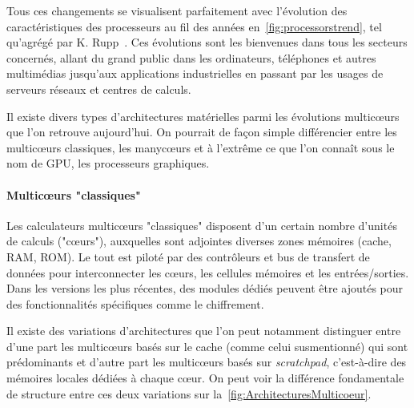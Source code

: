 \documentclass[french, a4paper, 11pt, twoside, pdftex]{StyleThese}
\begin{document}
		Tous ces changements se visualisent parfaitement avec l'évolution des caractéristiques des processeurs au fil des années en~\autoref{fig:processorstrend}, tel qu'agrégé par K. Rupp~\cite{rupp_48_2020}. Ces évolutions sont les bienvenues dans tous les secteurs concernés, allant du grand public dans les ordinateurs, téléphones et autres multimédias jusqu'aux applications industrielles en passant par les usages de serveurs réseaux et centres de calculs. %

		
		Il existe divers types d'architectures matérielles parmi les évolutions multicœurs que l'on retrouve aujourd'hui. On pourrait de façon simple différencier entre les multicœurs classiques, les manycœurs et à l'extrême ce que l'on connaît sous le nom de GPU, les processeurs graphiques.
		
		\paragraph{Multicœurs "classiques"} \label{Intro:multicoeurs}
		Les calculateurs multicœurs "classiques" disposent d'un certain nombre d'unités de calculs ("cœurs"), auxquelles sont adjointes diverses zones mémoires (cache, RAM, ROM). Le tout est piloté par des contrôleurs et bus de transfert de données pour interconnecter les cœurs, les cellules mémoires et les entrées/sorties. Dans les versions les plus récentes, des modules dédiés peuvent être ajoutés pour des fonctionnalités spécifiques comme le chiffrement.
			
		Il existe des variations d'architectures que l'on peut notamment distinguer entre d'une part les multicœurs basés sur le cache (comme celui susmentionné) qui sont prédominants et d'autre part les multicœurs basés sur \emph{scratchpad}, c'est-à-dire des mémoires locales dédiées à chaque cœur. On peut voir la différence fondamentale de structure entre ces deux variations sur la~\autoref{fig:ArchitecturesMulticoeur}.			
			
\end{document}
